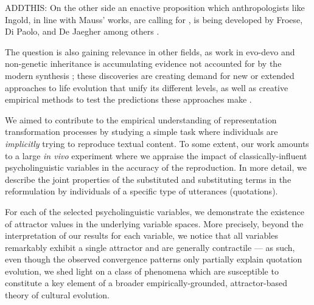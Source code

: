\begin{new}


ADDTHIS:
On the other side an enactive proposition which anthropologists like Ingold, in line with Mauss' works, are calling for \CN, is being developed by Froese, Di Paolo, and De Jaegher among others \CNs.

The question is also gaining relevance in other fields, as work in evo-devo and non-genetic inheritance is accumulating evidence not accounted for by the modern synthesis \CN;
these discoveries are creating demand for new or extended approaches to life evolution that unify its different levels, as well as creative empirical methods to test the predictions these approaches make \CN.

\end{new}

We aimed to contribute to the empirical understanding of representation transformation processes %
 by studying a simple task where individuals are \emph{implicitly} trying to reproduce textual content. To some extent, our work amounts to a large \emph{in vivo} experiment where we appraise the impact of classically-influent psycholinguistic variables in the accuracy of the reproduction.
In more detail, we describe the joint properties of the substituted and substituting terms in the reformulation by individuals of a specific type of utterances (quotations). %


For each of the selected psycholinguistic variables, we demonstrate the existence of attractor values in the underlying variable spaces. More precisely, beyond the interpretation of our results for each variable, we notice that all variables remarkably exhibit a single attractor and are generally contractile --- as such, even though the observed convergence patterns only partially explain quotation evolution, we shed light on a class of phenomena which are susceptible to constitute a key element of a broader empirically-grounded, attractor-based theory of cultural evolution.


